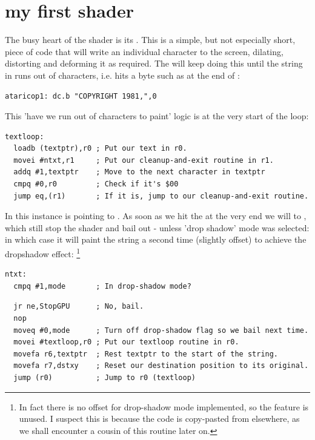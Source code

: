 \chapter{my first shader}
\lhead[tempest 2000]{}
\label{sec:listing}
\lstset{style=68KStyle}

The busy heart of the  shader is its . This is a simple, but not especially short, piece of code that
will write an individual character to the screen, dilating, distorting and deforming it as required. The  will
keep doing this until the string in  runs out of characters, i.e. hits a  byte such as at the end of
:

\begin{lstlisting}
ataricop1: dc.b "COPYRIGHT 1981,",0
\end{lstlisting}

This 'have we run out of characters to paint' logic is at the very start of the loop:

\begin{lstlisting}
textloop:
  loadb (textptr),r0 ; Put our text in r0.
  movei #ntxt,r1     ; Put our cleanup-and-exit routine in r1.
  addq #1,textptr    ; Move to the next character in textptr
  cmpq #0,r0         ; Check if it's $00
  jump eq,(r1)       ; If it is, jump to our cleanup-and-exit routine.
\end{lstlisting}

In this instance  is pointing to . As soon as we hit the  at the very end we will
 to , which still stop the shader and bail out - unless 'drop shadow' mode was selected: in which
case it will paint the string a second time (slightly offset) to achieve the dropshadow effect:
\footnote{
In fact there is no offset for drop-shadow mode implemented, so the feature is
unused.  I suspect this is because the code is copy-pasted from elsewhere, as
we shall encounter a cousin of this routine later on.
}

\begin{lstlisting}
ntxt:
  cmpq #1,mode       ; In drop-shadow mode?
\end{lstlisting}
\begin{lstlisting}
  jr ne,StopGPU      ; No, bail.
  nop
  moveq #0,mode      ; Turn off drop-shadow flag so we bail next time.
  movei #textloop,r0 ; Put our textloop routine in r0.
  movefa r6,textptr  ; Rest textptr to the start of the string.
  movefa r7,dstxy    ; Reset our destination position to its original.
  jump (r0)          ; Jump to r0 (textloop)
\end{lstlisting}


